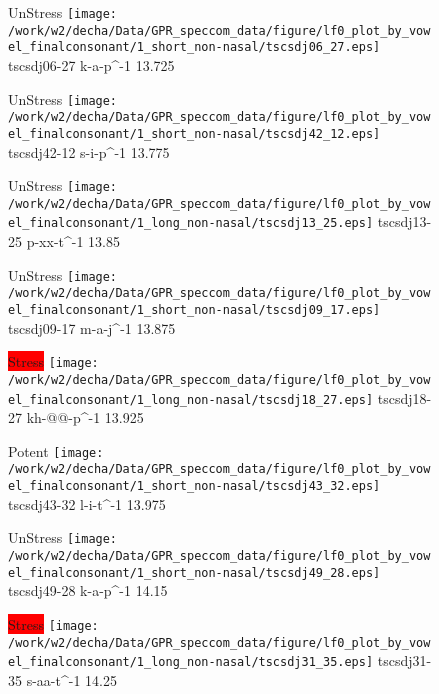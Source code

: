 \documentclass{article}
\begin{document}
\begin{figure}[t]
\begin{minipage}[b]{.24\textwidth}
UnStress
\centering
\texttt{[image: /work/w2/decha/Data/GPR\_speccom\_data/figure/lf0\_plot\_by\_vowel\_finalconsonant/1\_short\_non-nasal/tscsdj06\_27.eps]}
tscsdj06-27 k-a-p\textasciicircum-1 13.725
\end{minipage}
\begin{minipage}[b]{.24\textwidth}
UnStress
\centering
\texttt{[image: /work/w2/decha/Data/GPR\_speccom\_data/figure/lf0\_plot\_by\_vowel\_finalconsonant/1\_short\_non-nasal/tscsdj42\_12.eps]}
tscsdj42-12 s-i-p\textasciicircum-1 13.775
\end{minipage}
\begin{minipage}[b]{.24\textwidth}
UnStress
\centering
\texttt{[image: /work/w2/decha/Data/GPR\_speccom\_data/figure/lf0\_plot\_by\_vowel\_finalconsonant/1\_long\_non-nasal/tscsdj13\_25.eps]}
tscsdj13-25 p-xx-t\textasciicircum-1 13.85
\end{minipage}
\begin{minipage}[b]{.24\textwidth}
UnStress
\centering
\texttt{[image: /work/w2/decha/Data/GPR\_speccom\_data/figure/lf0\_plot\_by\_vowel\_finalconsonant/1\_short\_non-nasal/tscsdj09\_17.eps]}
tscsdj09-17 m-a-j\textasciicircum-1 13.875
\end{minipage}
\end{figure}
\clearpage
\begin{figure}[t]
\begin{minipage}[b]{.24\textwidth}
\colorbox{red}{Stress}
\centering
\texttt{[image: /work/w2/decha/Data/GPR\_speccom\_data/figure/lf0\_plot\_by\_vowel\_finalconsonant/1\_long\_non-nasal/tscsdj18\_27.eps]}
tscsdj18-27 kh-@@-p\textasciicircum-1 13.925
\end{minipage}
\begin{minipage}[b]{.24\textwidth}
\colorbox{Apricot}{Potent}
\centering
\texttt{[image: /work/w2/decha/Data/GPR\_speccom\_data/figure/lf0\_plot\_by\_vowel\_finalconsonant/1\_short\_non-nasal/tscsdj43\_32.eps]}
tscsdj43-32 l-i-t\textasciicircum-1 13.975
\end{minipage}
\begin{minipage}[b]{.24\textwidth}
UnStress
\centering
\texttt{[image: /work/w2/decha/Data/GPR\_speccom\_data/figure/lf0\_plot\_by\_vowel\_finalconsonant/1\_short\_non-nasal/tscsdj49\_28.eps]}
tscsdj49-28 k-a-p\textasciicircum-1 14.15
\end{minipage}
\begin{minipage}[b]{.24\textwidth}
\colorbox{red}{Stress}
\centering
\texttt{[image: /work/w2/decha/Data/GPR\_speccom\_data/figure/lf0\_plot\_by\_vowel\_finalconsonant/1\_long\_non-nasal/tscsdj31\_35.eps]}
tscsdj31-35 s-aa-t\textasciicircum-1 14.25
\end{minipage}
\end{figure}
\end{document}
